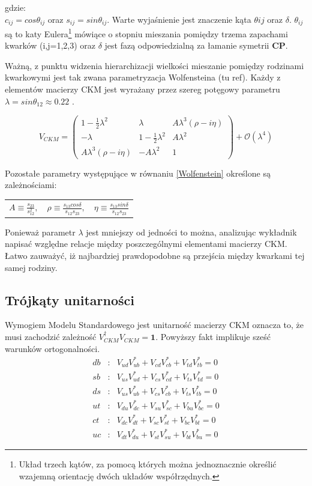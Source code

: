 gdzie:\\
$c_{ij}=cos\theta_{ij}$ oraz $s_{ij}=sin\theta_{ij}$. Warte wyjaśnienie jest znaczenie kąta $\theta{ij}$ oraz $\delta$. $\theta_{ij}$ są to katy Eulera\footnote{Układ trzech kątów, za pomocą których można jednoznacznie określić wzajemną orientację dwóch układów współrzędnych.} mówiące o stopniu mieszania pomiędzy trzema zapachami kwarków (i,j=1,2,3) oraz $\delta$ jest fazą odpowiedzialną za łamanie symetrii \textbf{CP}.

Ważną, z punktu widzenia hierarchizacji wielkości mieszanie pomiędzy rodzinami kwarkowymi jest tak zwana parametryzacja Wolfensteina (tu ref). Każdy z elementów macierzy CKM jest wyrażany przez szereg potęgowy parametru $\lambda=sin\theta_{12}\approx 0.22$ .

\begin{equation}
V_{CKM}=\begin{pmatrix}
1-\frac{1}{2}\lambda^2& \lambda & A\lambda^3(\rho-i\eta)\\
-\lambda & 1-\frac{1}{2}\lambda^2 & A\lambda^2\\
 A\lambda^3(\rho-i\eta) & -A\lambda^2 & 1
\end{pmatrix} +\mathcal{O}(\lambda^4) 
\label{Wolfenstein}
\end{equation}

Pozostałe parametry występujące w równaniu \ref{Wolfenstein} określone są zależnościami:
\begin{center}
\begin{tabular}{l c r}
$A \equiv \frac{s_{23}}{s^2_{12}},$&  $\rho \equiv  \frac{s_{13}cos\delta}{s_{12}s_{23}},$ & $\eta  \equiv \frac{s_{13}sin\delta}{s_{12}s_{23}}$
\end{tabular}
\end{center}

Ponieważ parametr $\lambda$ jest mniejszy od jedności to można, analizując wykładnik napisać względne relacje między poszczególnymi elementami macierzy CKM. Łatwo zauważyć, iż najbardziej prawdopodobne są przejścia między kwarkami tej samej rodziny.
\subsection{Trójkąty unitarności}

Wymogiem Modelu Standardowego jest unitarność macierzy CKM oznacza to, że musi zachodzić zależność $V^{\dagger}_{CKM}V_{CKM}=\mathbf{1}$. Powyższy fakt implikuje sześć warunków ortogonalności.
\begin{eqnarray}
db&:&V_{ud}V^*_{ub}+V_{cd}V^*_{cb}+V_{td}V^*_{tb}=0  \\
sb&:&V_{us}V^*_{ud}+V_{cs}V^*_{cd}+V_{ts}V^*_{td}=0  \\
ds&:&V_{us}V^*_{ub}+V_{cs}V^*_{cb}+V_{ts}V^*_{tb}=0  \\
ut&:&V_{du}V^*_{dc}+V_{su}V^*_{sc}+V_{bu}V^*_{bc}=0  \\
ct&:&V_{dc}V^*_{dt}+V_{sc}V^*_{st}+V_{bc}V^*_{bt}=0  \\
uc&:&V_{dt}V^*_{du}+V_{st}V^*_{su}+V_{bt}V^*_{bu}=0  
\end{eqnarray}


